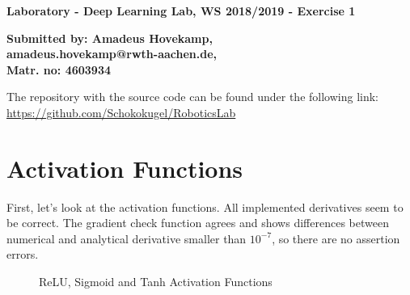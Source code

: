 \documentclass[
        a4paper,
        10pt,
        parskip = full,    %
    ]{scrartcl}
\begin{document}
\textbf{\large{Laboratory - Deep Learning Lab, WS 2018/2019 - Exercise 1}}

\textbf{\large{Submitted by: Amadeus Hovekamp,\\
amadeus.hovekamp@rwth-aachen.de,\\
Matr. no: 4603934}}

The repository with the source code can be found under the following link:\\
\href{https://github.com/Schokokugel/RoboticsLab}
     {https://github.com/Schokokugel/RoboticsLab}

\section{Activation Functions}
First, let's look at the activation functions. All implemented derivatives seem to be correct.
The gradient check function agrees and shows differences between numerical and analytical derivative smaller than $10^{-7}$, so there are no assertion errors.

\begin{figure}[H]
	\centering
    	\caption{ReLU, Sigmoid and Tanh Activation Functions}
\label{fig1}
\end{figure}
\end{document}
